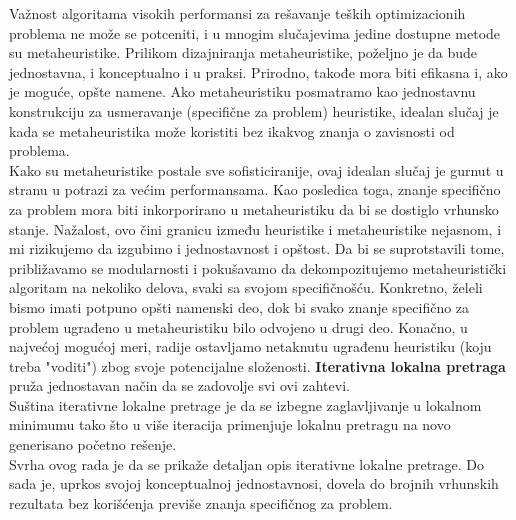 \documentclass[a4paper]{article}
\begin{document}
Važnost algoritama visokih performansi za rešavanje teških optimizacionih problema ne može se potceniti, i u mnogim
slučajevima jedine dostupne metode su metaheuristike. Prilikom dizajniranja metaheuristike, poželjno je da bude jednostavna, i
konceptualno i u praksi. Prirodno, takođe mora biti efikasna i, ako je moguće, opšte namene. Ako metaheuristiku posmatramo kao
jednostavnu konstrukciju za usmeravanje (specifične za problem) heuristike, idealan slučaj je kada se metaheuristika može
koristiti bez ikakvog znanja o zavisnosti od problema.\\ Kako su metaheuristike postale sve sofisticiranije, ovaj idealan
slučaj je gurnut u stranu u potrazi za većim performansama. Kao posledica toga, znanje specifično za problem mora biti
inkorporirano u metaheuristiku da bi se dostiglo vrhunsko stanje. Nažalost, ovo čini granicu između heuristike i
metaheuristike nejasnom, i mi rizikujemo da izgubimo i jednostavnost i opštost. Da bi se suprotstavili tome, približavamo se
modularnosti i pokušavamo da dekompozitujemo metaheuristički algoritam na nekoliko delova, svaki sa svojom specifičnošću.
Konkretno, želeli bismo imati potpuno opšti namenski deo, dok bi svako znanje specifično za problem ugrađeno u metaheuristiku
bilo odvojeno u drugi deo. Konačno, u najvećoj mogućoj meri, radije ostavljamo netaknutu ugrađenu heuristiku (koju treba
"voditi") zbog svoje potencijalne složenosti. \textbf{Iterativna lokalna pretraga} pruža jednostavan način da se zadovolje svi
ovi zahtevi.\\
Suština iterativne lokalne pretrage je da se izbegne zaglavljivanje u lokalnom minimumu tako što u više iteracija primenjuje
lokalnu pretragu na novo generisano početno rešenje. \\ 
Svrha ovog rada je da se prikaže detaljan opis iterativne lokalne pretrage.
Do sada je, uprkos svojoj konceptualnoj jednostavnosi, dovela do brojnih vrhunskih rezultata bez korišćenja previše znanja
specifičnog za problem.








\end{document}
